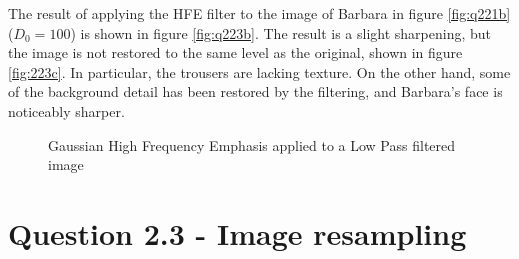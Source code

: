 \documentclass{article}
\begin{document}
The result of applying the HFE filter to the image of Barbara in figure \ref{fig:q221b}  ($D_0 = 100$) is shown in figure \ref{fig:q223b}. The result is a slight sharpening, but the image is not restored to the same level as the original, shown in figure \ref{fig:223c}. In particular, the trousers are lacking texture. On the other hand, some of the background detail has been restored by the filtering, and Barbara's face is noticeably sharper.
\begin{figure}[h]
\centering
	\qquad
	\qquad
	\qquad
	\caption{Gaussian High Frequency Emphasis applied to a Low Pass filtered image}
	\label{fig:q223}
\end{figure}


\section*{Question 2.3 - Image resampling}
\end{document}
